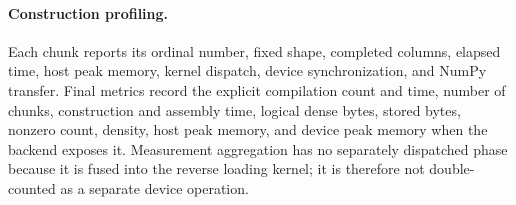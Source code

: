\paragraph{Construction profiling.}
Each chunk reports its ordinal number, fixed shape, completed columns, elapsed
time, host peak memory, kernel dispatch, device synchronization, and NumPy
transfer. Final metrics record the explicit compilation count and time, number
of chunks, construction and assembly time, logical dense bytes, stored bytes,
nonzero count, density, host peak memory, and device peak memory when the
backend exposes it. Measurement aggregation has no separately dispatched phase
because it is fused into the reverse loading kernel; it is therefore not
double-counted as a separate device operation.


